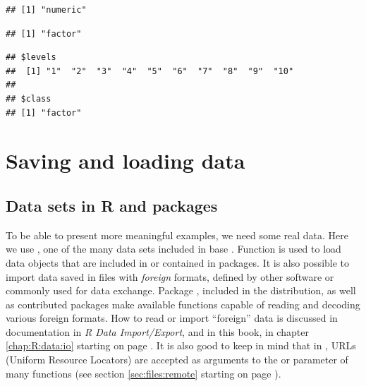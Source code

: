 \documentclass[krantz2]{krantz}\usepackage{knitr}
\begin{document}
\begin{warningbox}
\begin{knitrout}\footnotesize
{}\color{fgcolor}\begin{kframe}
\begin{alltt}
 \hlkwb{<-} 
\end{alltt}
\begin{verbatim}
## [1] "numeric"
\end{verbatim}
\begin{alltt}
\end{alltt}
\begin{verbatim}
## [1] "factor"
\end{verbatim}
\begin{alltt}
\end{alltt}
\begin{verbatim}
## $levels
##  [1] "1"  "2"  "3"  "4"  "5"  "6"  "7"  "8"  "9"  "10"
## 
## $class
## [1] "factor"
\end{verbatim}
\end{kframe}
\end{knitrout}
\end{warningbox}




\section{Saving and loading data}

\subsection{Data sets in R and packages}
To be able to present more meaningful examples, we need some real data. Here we use , one of the many data sets included in base \Rpgrm. Function  is used to load data objects that are included in \Rlang or contained in packages. It is also possible to import data saved in files with \textit{foreign} formats, defined by other software or commonly used for data exchange. Package , included in the \Rlang distribution, as well as contributed packages make available functions capable of reading and decoding various foreign formats. How to read or import ``foreign'' data is discussed in \Rlang documentation in \emph{R Data Import/Export}, and in this book, in chapter \ref{chap:R:data:io} starting on page \pageref{chap:R:data:io}. It is also good to keep in mind that in \Rlang, URLs (Uniform Resource Locators) are accepted as arguments to the  or  parameter of many functions (see section \ref{sec:files:remote} starting on page \pageref{sec:files:remote}).
\end{document}
